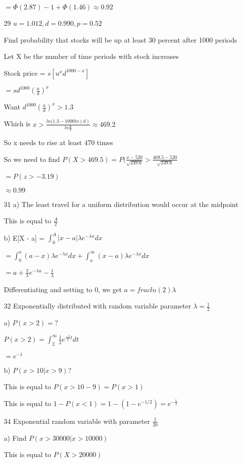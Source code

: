 \documentclass[12pt]{article}
\begin{document}
\begin{itemize}
  $=\Phi(2.87) - 1 + \Phi(1.46) \approx 0.92$
\item[29]
  $u = 1.012, d = 0.990, p = 0.52$

  Find probability that stocks will be up at least 30 percent after 1000 periods

  Let X be the number of time periods with stock increases

  Stock price = $s[u^xd^{1000-x}]$

  $= sd^{1000} (\frac{u}{d})^x$

  Want $d^{1000} (\frac{u}{d})^x > 1.3$

  Which is $x > \frac{ln(1.3 - 1000ln(d)}{ln{\frac{u}{d}}} \approx 469.2$

  So x needs to rise at least 470 times

  So we need to find $P(X > 469.5) = P(\frac{x - 520}{\sqrt{249.6}} > \frac{469.5 - 520}{\sqrt{249.6}}$

  $=P(z > -3.19)$

  $\approx 0.99$
\item[31]
  a) The least travel for a uniform distribution would occur at the midpoint

  This is equal to $\frac{A}{2}$

  b) E[X - a] = $\int_0^A |x-a|\lambda e^{-\lambda x} dx$

  $= \int_0^a (a - x) \lambda e^{-\lambda x} dx + \int_a^{\infty} (x - a) \lambda e^{-\lambda x} dx$

  $= a + \frac{2}{\lambda}e^{-\lambda a} - \frac{1}{\lambda}$

  Differentiating and setting to 0, we get $a =frac{ln(2)}{\lambda}$
\item[32]
  Exponentially distributed with random variable parameter $\lambda = \frac{1}{2}$

  a) $P(x > 2) =?$

  $P(x > 2) = \int_2^{\infty} \frac{1}{2} e^{\frac{-1}{2}t} dt$

  $=e^{-1}$

  b) $P(x > 10 | x > 9)$?

  This is equal to $P(x > 10-9) = P(x > 1)$

  This is equal to $1 - P(x < 1) = 1 - (1-e^{-1/2}) = e^{-\frac{1}{2}}$
\item[34]
  Exponential random variable with parameter $\frac{1}{20}$

  a) Find $P(x > 30000 | x > 10000)$

  This is equal to $P(X > 20000)$


\end{itemize}
\end{document}
